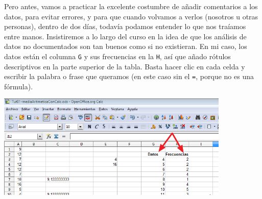 \documentclass[10pt,a4paper]{article}\usepackage[]{graphicx}\usepackage[]{color}
\begin{document}
Pero antes, vamos a practicar la excelente costumbre de añadir comentarios a los datos, para evitar errores, y para que cuando volvamos a verlos (nosotros u otras personas), dentro de dos días, todavía podamos entender lo que nos traíamos entre manos. Insistiremos a lo largo del curso en la idea de que los análisis de datos no documentados son tan buenos como si no existieran. En mi caso, los datos están el columna {\tt G} y sus frecuencias en la {\tt H}, así que añado rótulos descriptivos en la parte superior de la tabla. Basta hacer clic en cada celda y escribir la palabra o frase que queramos (en este caso sin el {\tt =}, porque no es una fórmula).
    \begin{center}
    \includegraphics[height=5cm]{../fig/Tut01-Calc-Formula-22.png}
    \end{center}
\end{document}
